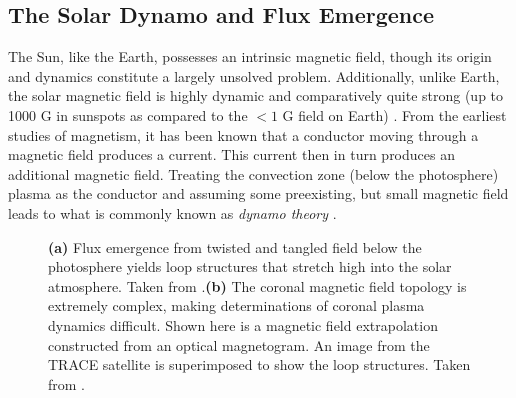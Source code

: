 \subsection{The Solar Dynamo and Flux Emergence}
\label{subsec:dynamo_flux}
\par The Sun, like the Earth, possesses an intrinsic magnetic field, though its origin and dynamics constitute a largely unsolved problem. Additionally, unlike Earth, the solar magnetic field is highly dynamic and comparatively quite strong (up to 1000 G in sunspots as compared to the $<1$ G field on Earth) \citep{aschwanden_physics_2006}. From the earliest studies of magnetism, it has been known that a conductor moving through a magnetic field produces a current. This current then in turn produces an additional magnetic field. Treating the convection zone (below the photosphere) plasma as the conductor and assuming some preexisting, but small magnetic field leads to what is commonly known as \textit{dynamo theory} \citep{golub_solar_2010}.
%
\begin{figure}
	\centering
	\caption{\textbf{(a)} Flux emergence from twisted and tangled field below the photosphere yields loop structures that stretch high into the solar atmosphere. Taken from \citet{gold_magnetic_1964}.\textbf{(b)} The coronal magnetic field topology is extremely complex, making determinations of coronal plasma dynamics difficult. Shown here is a magnetic field extrapolation constructed from an optical magnetogram. An image from the TRACE satellite is superimposed to show the loop structures. Taken from \citet{reale_coronal_2010}.}
	\label{fig:complex_fields}
\end{figure}
